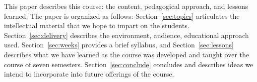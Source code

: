 This paper describes this course: the content, pedagogical approach, and lessons learned.  The paper is organized as follows: Section~\ref{sec:topics} articulates the intellectual material that we hope to impart on the students. Section~\ref{sec:delivery} describes the environment, audience, educational approach used. Section~\ref{sec:weeks} provides a brief syllabus, and Section~\ref{sec:lessons} describes what we have learned as the course was developed and taught over the course of seven semesters. Section~\ref{sec:conclude} concludes and describes ideas we intend to incorporate into future offerings of the course.







